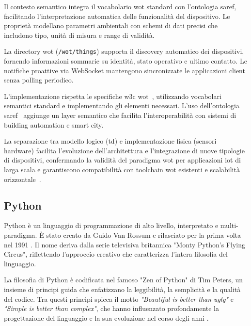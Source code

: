 Il contesto semantico integra il vocabolario \acrshort{wot} standard con l'ontologia \acrshort{saref},
facilitando l'interpretazione automatica delle funzionalità del dispositivo. Le proprietà modellano
parametri ambientali con schemi di dati precisi che includono tipo, unità di misura e range di validità.

La directory \acrshort{wot} (\texttt{/wot/things}) supporta il discovery automatico dei dispositivi,
fornendo informazioni sommarie su identità, stato operativo e ultimo contatto.
Le notifiche proattive via WebSocket mantengono sincronizzate le applicazioni client senza polling periodico.

L'implementazione rispetta le specifiche \acrshort{w3c} \acrshort{wot}~\cite{w3c-wot-architecture}, utilizzando
vocabolari semantici standard e implementando gli elementi necessari.
L'uso dell'ontologia \acrshort{saref}~\cite{saref-ontology} aggiunge un layer semantico che facilita
l'interoperabilità con sistemi di building automation e smart city.

La separazione tra modello logico (\acrlong{td}) e implementazione fisica (sensori hardware) facilita l'evoluzione
dell'architettura e l'integrazione di nuove tipologie di dispositivi, confermando la validità del paradigma
\acrshort{wot} per applicazioni \acrshort{iot} di larga scala e garantiscono compatibilità
con toolchain \acrshort{wot} esistenti e scalabilità orizzontale~\cite{guinard-wot}.

\subsection{Python}

Python è un linguaggio di programmazione di alto livello, interpretato e multi-paradigma.
È stato creato da Guido Van Rossum e rilasciato per la prima volta nel 1991 \citep{van_rossum_1995}.
Il nome deriva dalla serie televisiva britannica "Monty Python's Flying Circus", riflettendo l'approccio creativo
che caratterizza l'intera filosofia del linguaggio.

La filosofia di Python è codificata nel famoso "Zen of Python" di Tim Peters, un insieme di principi guida
che enfatizzano la leggibilità, la semplicità e la qualità del codice. Tra questi principi spicca il motto
\textit{"Beautiful is better than ugly"} e \textit{"Simple is better than complex"}, che hanno influenzato profondamente
la progettazione del linguaggio e la sua evoluzione nel corso degli anni \citep{peters_2004}.

